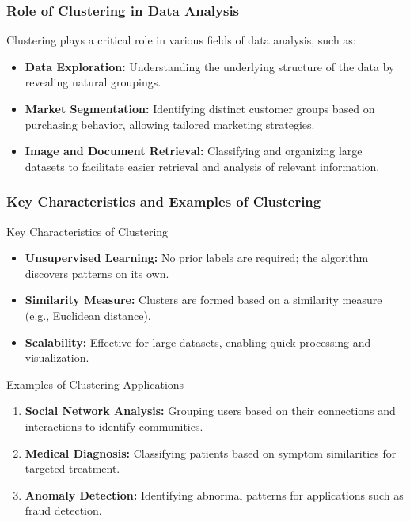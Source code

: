 \documentclass[aspectratio=169]{beamer}
\begin{document}
\begin{frame}[fragile]
    \frametitle{Role of Clustering in Data Analysis}
    Clustering plays a critical role in various fields of data analysis, such as:
    \begin{itemize}
        \item \textbf{Data Exploration:} Understanding the underlying structure of the data by revealing natural groupings.
        \item \textbf{Market Segmentation:} Identifying distinct customer groups based on purchasing behavior, allowing tailored marketing strategies.
        \item \textbf{Image and Document Retrieval:} Classifying and organizing large datasets to facilitate easier retrieval and analysis of relevant information.
    \end{itemize}
\end{frame}

\begin{frame}[fragile]
    \frametitle{Key Characteristics and Examples of Clustering}
    \begin{block}{Key Characteristics of Clustering}
        \begin{itemize}
            \item \textbf{Unsupervised Learning:} No prior labels are required; the algorithm discovers patterns on its own.
            \item \textbf{Similarity Measure:} Clusters are formed based on a similarity measure (e.g., Euclidean distance).
            \item \textbf{Scalability:} Effective for large datasets, enabling quick processing and visualization.
        \end{itemize}
    \end{block}

    \begin{block}{Examples of Clustering Applications}
        \begin{enumerate}
            \item \textbf{Social Network Analysis:} Grouping users based on their connections and interactions to identify communities.
            \item \textbf{Medical Diagnosis:} Classifying patients based on symptom similarities for targeted treatment.
            \item \textbf{Anomaly Detection:} Identifying abnormal patterns for applications such as fraud detection.
        \end{enumerate}
    \end{block}
\end{frame}
\end{document}
